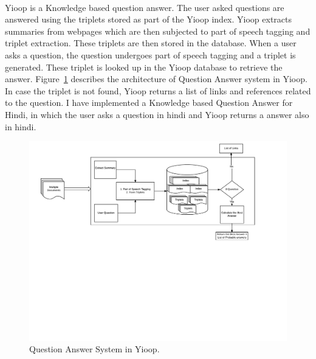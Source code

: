  \paragraph{}
 Yioop is a Knowledge based question answer. The user asked questions are answered using the triplets stored as part of the Yioop index. Yioop extracts summaries from webpages which are then subjected to part of speech tagging and triplet extraction. These triplets are then stored in the database. When a user asks a question, the question undergoes part of speech tagging and a triplet is generated. These triplet is looked up in the Yioop database to retrieve the answer. Figure~\ref{fig:QA_Yioop}  describes the architecture of Question Answer system in Yioop. In case the triplet is not found, Yioop returns a list of links and references related to the question. I have implemented a Knowledge based Question Answer for Hindi, in which the user asks a question in hindi and Yioop returns a answer also in hindi.
 
 \begin{figure}[htb]
\centering
\includegraphics[scale=0.4]{images/QA_Yioop.jpg}
\caption{Question Answer System in Yioop.} 
\label{fig:QA_Yioop}
\end{figure}